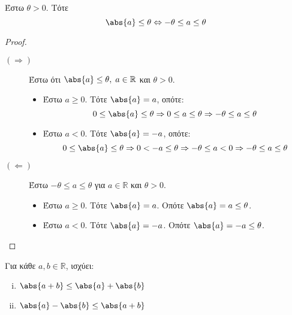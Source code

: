 \documentclass[main.tex]{subfiles}
\begin{document}
\begin{prop}
    Έστω $ \theta > 0 $. Τότε 
    \[
        \abs{a} \leq \theta \Leftrightarrow - \theta \leq a \leq \theta  
     \]

     \begin{proof}
     \item {}
         \begin{description}
             \item [$(  \Rightarrow ) $] 
                 Έστω ότι $ \abs{a} \leq \theta, \; a \in \mathbb{R} $ και 
                 $ \theta >0 $. 
                 \begin{itemize}
                     \item Έστω $ a \geq 0 $. Τότε $ \abs{a} = a $, οπότε:
                         \[
                             0 \leq \abs{a} \leq \theta \Rightarrow 
                             0 \leq a \leq \theta \Rightarrow - \theta 
                              \leq a \leq \theta
                          \] 
                      \item Έστω $ a < 0 $. Τότε $ \abs{a} = -a $, οπότε:
                          \[
                              0 \leq \abs{a} \leq \theta \Rightarrow 
                              0 < -a \leq \theta \Rightarrow 
                               - \theta \leq a < 0 \Rightarrow 
                               - \theta \leq a \leq \theta 
                           \] 
                 \end{itemize}
             \item [$(\Leftarrow)$] Έστω $ - \theta \leq a \leq \theta $ 
                 για $ a \in \mathbb{R} $ και $ \theta >0 $.
                 \begin{itemize}
                     \item Έστω $ a \geq 0 $. Τότε $ \abs{a} = a $. Οπότε 
                         $ \abs{a} = a \leq \theta $.
                     \item Έστω $ a <0 $. Τότε $ \abs{a} = -a $. Οπότε
                         $ \abs{a} = -a \leq \theta $.
                 \end{itemize}
         \end{description}
     \end{proof}
\end{prop}

\begin{prop}
    Για κάθε $ a, b \in \mathbb{R} $, ισχύει:
    \begin{enumerate}[i)]
        \item $ \abs{a+b} \leq \abs{a} + \abs{b}   $
        \item $ \abs{a} - \abs{b} \leq \abs{a+b}  $
    \end{enumerate}
\end{prop}
\end{document}
